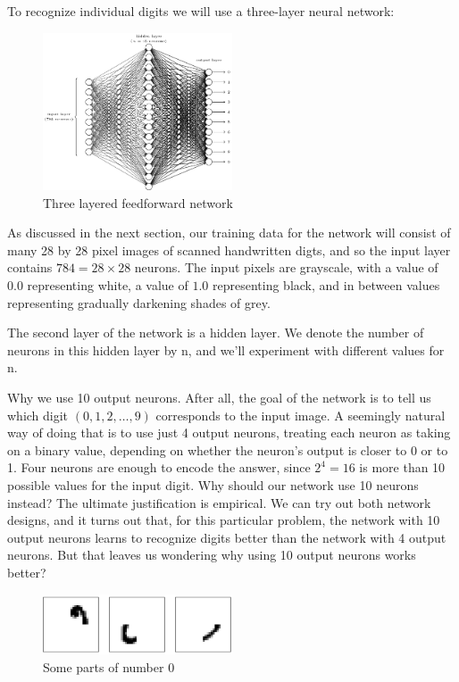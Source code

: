 \documentclass[12 pt]{article}
\begin{document}
To recognize individual digits we will use a three-layer neural network:

\begin{figure}[htp]
\centering
\includegraphics[width=0.5\textwidth]{./figs/tikz12.png}
\caption{Three layered feedforward network}
\end{figure}

As discussed in the next section, our training data for the network will
consist of many 28 by 28 pixel images of scanned handwritten digts, and
so the input layer contains $ 784 = 28 \times 28 $ neurons. The input
pixels are grayscale, with a value of 0.0 representing white, a value of
$ 1.0 $ representing black, and in between values representing gradually
darkening shades of grey.

The second layer of the network is a hidden layer. We denote the number
of neurons in this hidden layer by n, and we'll experiment with
different values for n.

Why we use 10 output neurons. After all, the goal of the network is to
tell us which digit $ (0, 1, 2, \ldots{}, 9) $ corresponds to the
input image. A seemingly natural way of doing that is to use just 4
output neurons, treating each neuron as taking on a binary value,
depending on whether the neuron's output is closer to 0 or to 1. Four
neurons are enough to encode the answer, since $ 2 ^ 4 = 16 $ is
more than 10 possible values for the input digit. Why should our network
use 10 neurons instead? The ultimate justification is empirical. We can
try out both network designs, and it turns out that, for this particular
problem, the network with 10 output neurons learns to recognize digits
better than the network with 4 output neurons. But that leaves us
wondering why using 10 output neurons works better?

\begin{figure}[htp]
\centering
\includegraphics[width=0.5\textwidth]{./figs/mnist_other_features.png}
\caption{Some parts of number 0}
\end{figure}
\end{document}
